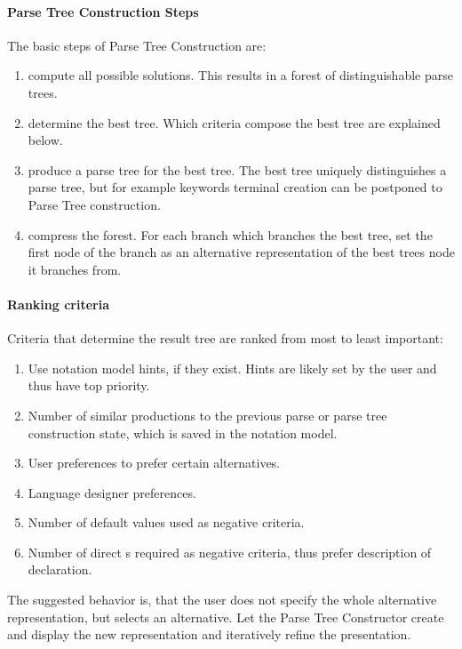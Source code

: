 \paragraph{Parse Tree Construction Steps}
The basic steps of Parse Tree Construction are:
\begin{enumerate}
	\item compute all possible solutions. This results in a forest of distinguishable parse trees.
	\item determine the best tree. Which criteria compose the best tree are explained below.
	\item produce a parse tree for the best tree. The best tree uniquely distinguishes a parse tree, but for example keywords terminal creation can be postponed to Parse Tree construction.
	\item compress the forest. For each branch which branches the best tree, set the first node of the branch as an alternative representation of the best trees node it branches from.\\
\end{enumerate}

\paragraph{Ranking criteria} Criteria that determine the result tree are ranked from most to least important:
\begin{enumerate}
	\item Use notation model hints, if they exist. Hints are likely set by the user and thus have top priority.
	\item Number of similar productions to the previous parse or parse tree construction state, which is saved in the notation model.
	\item User preferences to prefer certain alternatives.
	\item Language designer preferences.
	\item Number of default values used as negative criteria.
	\item Number of direct s required as negative criteria, thus prefer description of declaration.
\end{enumerate}

The suggested behavior is, that the user does not specify the whole alternative representation, but selects an alternative. Let the Parse Tree Constructor create and display the new representation and iteratively refine the presentation. 


